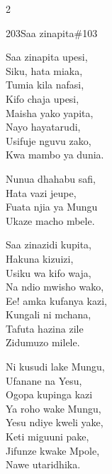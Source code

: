 \begin{multicols}{2}
\begin{hymn}{203}{Saa zinapita}{\#103}
\begin{stanza}
Saa zinapita upesi,\\
Siku, hata miaka,\\
Tumia kila nafasi,\\
Kifo chaja upesi,\\
Maisha yako yapita,\\
Nayo hayatarudi,\\
Usifuje nguvu zako,\\
Kwa mambo ya dunia.
\end{stanza}
\begin{chorus}
Nunua dhahabu safi,\\
Hata vazi jeupe,\\
Fuata njia ya Mungu\\
Ukaze macho mbele.
\end{chorus}
\begin{stanza}
Saa zinazidi kupita,\\
Hakuna kizuizi,\\
Usiku wa kifo waja,\\
Na ndio mwisho wako,\\
Ee! amka kufanya kazi,\\
Kungali ni mchana,\\
Tafuta hazina zile\\
Zidumuzo milele.
\end{stanza}
\begin{stanza}
Ni kusudi lake Mungu,\\
Ufanane na Yesu,\\
Ogopa kupinga kazi\\
Ya roho wake Mungu,\\
Yesu ndiye kweli yake,\\
Keti miguuni pake,\\
Jifunze kwake Mpole,\\
Nawe utaridhika.
\end{stanza}
\end{hymn}


\end{multicols}
